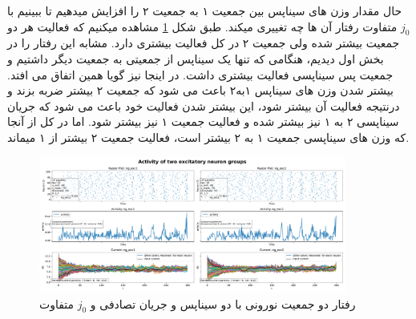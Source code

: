             حال مقدار وزن های سیناپس بین جمعیت ۱ به جمعیت ۲ را افزایش میدهیم تا ببینیم با 
            $j_0$
            متفاوت رفتار آن ها چه تغییری میکند. طبق شکل 
            \ref{fig:part2-two-ng-full-synapse-diff-j-rand-curr}
            مشاهده میکنیم که فعالیت هر دو جمعیت بیشتر شده ولی جمعیت ۲ در کل فعالیت بیشتری دارد. مشابه این رفتار را در بخش اول دیدیم، هنگامی که تنها یک سیناپس از جمعیتی به جمعیت دیگر داشتیم و جمعیت پس سیناپسی فعالیت بیشتری داشت. در اینجا نیز گویا همین اتفاق می افتد. بیشتر شدن وزن های سیناپس ۱به۲ باعث می شود که جمعیت ۲ بیشتر ضربه بزند و درنتیجه فعالیت آن بیشتر شود، این بیشتر شدن فعالیت خود باعث می شود که جریان سیناپسی 
            ۲ به ۱
            نیز بیشتر شده و فعالیت جمعیت ۱ نیز بیشتر شود. اما در کل از آنجا که وزن های سیناپسی جمعیت ۱ به ۲ بیشتر است، فعالیت جمعیت ۲ بیشتر از ۱ میماند.
            \begin{figure}[!ht]
                \centering
                \includegraphics[width=0.9\textwidth]{plots/part2-two-ng-full-synapse-diff-j-rand-curr.pdf} 
                \caption{رفتار دو جمعیت نورونی با دو سیناپس و جریان تصادفی و $j_0$ متفاوت}
                \label{fig:part2-two-ng-full-synapse-diff-j-rand-curr}
            \end{figure}
